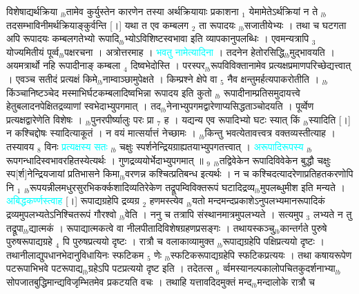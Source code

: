\documentclass[article,12pt,a4paper]{memoir}%
\newcommand{\quotelemma}[1]{\textcolor{cyan}{#1}}
\begin{document}
विशेषाद्यर्थक्रिया {\tiny $_{lb}$}तामेव कुर्युस्तेन कारणेन तस्या अर्थक्रियायाः प्रकाशना {\tiny $_{1}$} येमामेतेऽर्थक्रियां न ते {\tiny $_{lb}$}तदसम्भाविनीमर्थक्रियाङ्कुर्वन्ति [।] यथा त एव कम्बलग {\tiny $_{2}$} ता रूपादयः {\tiny $_{lb}$}सजातीयेभ्यः । तथा च घटगता अपि रूपादयः कम्बलगतेभ्यो रूपादि{\tiny $_{lb}$}भ्योऽविशिष्टस्वभावा इति व्यापकानुपलब्धिः । एवमन्यत्रापि {\tiny $_{3}$} योज्यमितीयं पूर्व्व{\tiny $_{lb}$}पक्षरचना । अत्रोत्तरमाह । \quotelemma{भवतु नामेत्यादिना} \cite[3a9]{vn-msN} । तदनेन हेतोरसिद्धि{\tiny $_{lb}$}मुद्भावयति । अयमत्रार्थो नहि रूपादीनाङ् कम्बला {\tiny $_{4}$} दिष्वभेदोस्ति । परस्पर{\tiny $_{lb}$}रूपविविक्तानामेव प्रत्यक्षप्रमाणपरिच्छेद्यत्त्वात् । एवञ्च सतीदं प्रत्यक्षं किमे{\tiny $_{lb}$}नाम्वाञ्छामुपेक्षते । किम्प्रश्ने क्षेपे वा {\tiny $_{5}$} नैव क्षन्तुमर्हत्यपाकरोतीति । {\tiny $_{lb}$}किंञ्चानिष्टञ्चेद \cite[3a10]{vn-msN} मस्माभिर्घटकम्बलादिष्वभिन्ना रूपादय इति कुतो {\tiny $_{lb}$} \leavevmode{} रूपादीनाम्प्रतिसमुदायत्त्वे हेतुबलादनपेक्षितद्रव्याणां स्वभेदाभ्युपगमात् । तद{\tiny $_{lb}$}नेनाभ्युपगमद्वारेणाप्यसिद्धताञ्चोदयति । पूर्व्वेण प्रत्यक्षद्वारेणेति विशेषः । {\tiny $_{lb}$}पुनरपीर्ष्यालुः परः प्रा {\tiny $_{7}$} ह । यद्यन्य एव रूपादिभ्यो घटः स्यात् किं {\tiny $_{lb}$}स्यादिति [।] न कश्चिद्दोषः स्यादित्याकूतं । न वयं मात्सर्यात्तं नेच्छामः । {\tiny $_{lb}$}किन्तु भवत्येतावत्त्वत्र वक्तव्यस्तीत्याह । तस्यावय {\tiny $_{8}$} विनः \quotelemma{प्रत्यक्षस्य सतः} {\tiny $_{lb}$} \cite[3a10]{vn-msN} चक्षुः स्पर्शनेन्द्रियग्राह्यतयाभ्युपगतत्त्वात् । \quotelemma{अरूपादिरूपस्य} {\tiny $_{lb}$} \cite[3a10]{vn-msN} रूपगन्धादिस्वभावरहितस्येत्यर्थः । गुणद्रव्ययोर्भेदाभ्युपगमात् ॥ {\tiny $_{9}$} \leavevmode{} {\tiny $_{lb}$}तद्विवेकेन रूपादिविवेकेन बुद्धौ चक्षुः स्प[र्श]नेन्द्रियजायां प्रतिभासने किमा{\tiny $_{lb}$}वरणन्न कश्चित्प्रतिबन्ध इत्यर्थः । न च कश्चिदत्यादरेणाप्रतिहतकरणोपि नि {\tiny $_{1}$} {\tiny $_{lb}$}रूपयन्नीलमधुरसुरभिकर्क्कशादिव्यतिरेकेण तद्रूपम्विविक्तरूपं घटादिद्रव्य{\tiny $_{lb}$}मुपलब्धुमीश इति मन्यते । \quotelemma{अबिद्धकर्ण्णस्त्वाह} [।] रूपाद्यग्रहेपि द्रव्यग्र {\tiny $_{2}$} हणमस्त्येव {\tiny $_{lb}$}यतो मन्दमन्दप्रकाशेऽनुपलभ्यमानरूपादिकं द्रव्यमुपलभ्यतेऽनिश्चितरूपं गौरश्वो {\tiny $_{lb}$}वेति । ननु च तत्रापि संस्थानमात्रमुपलभ्यते । सत्यमुप {\tiny $_{3}$} लभ्यते न तु तद्रूपा{\tiny $_{lb}$}द्यात्मकं । रूपाद्यात्मकत्वे वा नीलपीतादिविशेषग्रहणप्रसङ्गः । तथायस्कञ्चु{\tiny $_{lb}$}कान्तर्गते पुरुषे पुरुषरूपाद्यग्रहे {\tiny $_{4}$} पि पुरुषप्रत्ययो दृष्टः । रात्रौ च वलाकाव्यामुक्त {\tiny $_{lb}$}रूपाद्यग्रहेपि पक्षिप्रत्ययो दृष्टः । तथानीलाद्युपधानभेदानुविधायिनः स्फटिकम {\tiny $_{5}$} णेः {\tiny $_{lb}$}स्फटिकरूपाद्यग्रहेपि स्फटिकप्रत्ययः । तथा कषायरूपेण पटरूपाभिभवे पटरूपाद्य{\tiny $_{lb}$}ग्रहेऽपि पटप्रत्ययो दृष्ट इति । तदेतत्स {\tiny $_{6}$} र्व्वमस्यानल्पकालोपचितकुदर्शनाभ्या{\tiny $_{lb}$}सोपजातबुद्धिमान्द्यविजृम्भितमेव प्रकटयति वचः । तथाहि यत्तावदिदमुक्तं मन्द{\tiny $_{lb}$}मन्दालोके रात्रौ च 
\end{document}

